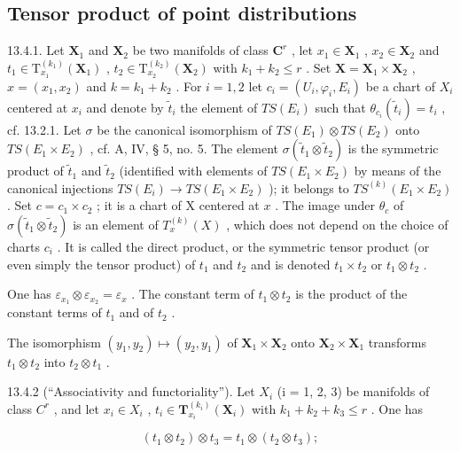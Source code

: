 \subsection{Tensor product of point distributions}

13.4.1. Let \(\mathbf{X}_1\) and \(\mathbf{X}_2\) be two manifolds of class \(\mathbf{C}^r\) , let \(x_1 \in \mathbf{X}_1\) , \(x_2 \in \mathbf{X}_2\) and \(t_1 \in \mathrm{T}_{x_1}^{(k_1)}(\mathbf{X}_1)\) , \(t_2 \in \mathrm{T}_{x_2}^{(k_2)}(\mathbf{X}_2)\) with \(k_1 + k_2 \leqslant r\) . Set \(\mathbf{X} = \mathbf{X}_1 \times \mathbf{X}_2\) , \(x = (x_1, x_2)\) and \(k = k_{1} + k_{2}\) . For \(i = 1, 2\) let \(c_{i} = (U_{i}, \varphi_{i}, E_{i})\) be a chart of \(X_{i}\) centered at \(x_{i}\) and denote by \(\tilde{t}_{i}\) the element of \(TS(E_{i})\) such that \(\theta_{c_i}(\tilde{t}_{i}) = t_{i}\) , cf. 13.2.1. Let \(\sigma\) be the canonical isomorphism of \(TS(E_{1}) \otimes TS(E_{2})\) onto \(TS(E_{1} \times E_{2})\) , cf. A, IV, § 5, no. 5. The element \(\sigma(\tilde{t}_{1} \otimes \tilde{t}_{2})\) is the symmetric product of \(\tilde{t}_{1}\) and \(\tilde{t}_{2}\) (identified with elements of \(TS(E_{1} \times E_{2})\) by means of the canonical injections \(TS(E_{i}) \to TS(E_{1} \times E_{2})\) ); it belongs to \(TS^{(k)}(E_{1} \times E_{2})\) . Set \(c = c_{1} \times c_{2}\) ; it is a chart of X centered at \(x\) . The image under \(\theta_{c}\) of \(\sigma(\tilde{t}_{1} \otimes \tilde{t}_{2})\) is an element of \(T_{x}^{(k)}(X)\) , which does not depend on the choice of charts \(c_{i}\) . It is called the direct product, or the symmetric tensor product (or even simply the tensor product) of \(t_{1}\) and \(t_{2}\) and is denoted \(t_{1} \times t_{2}\) or \(t_{1} \otimes t_{2}\) .

One has \(\varepsilon_{x_1} \otimes \varepsilon_{x_2} = \varepsilon_x\) . The constant term of \(t_1 \otimes t_2\) is the product of the constant terms of \(t_1\) and of \(t_2\) .

The isomorphism \((y_{1}, y_{2}) \mapsto (y_{2}, y_{1})\) of \(\mathbf{X}_{1} \times \mathbf{X}_{2}\) onto \(\mathbf{X}_{2} \times \mathbf{X}_{1}\) transforms \(t_{1} \otimes t_{2}\) into \(t_{2} \otimes t_{1}\) .

13.4.2 (“Associativity and functoriality”). Let \(X_{i}\) (i = 1, 2, 3) be manifolds of class \(C^{r}\) , and let \(x_{i} \in X_{i}\) , \(t_{i} \in \mathbf{T}_{x_{i}}^{(k_{i})}(\mathbf{X}_{i})\) with \(k_{1} + k_{2} + k_{3} \leqslant r\) . One has

\[
\left(t _ {1} \otimes t _ {2}\right) \otimes t _ {3} = t _ {1} \otimes \left(t _ {2} \otimes t _ {3}\right);
\]

